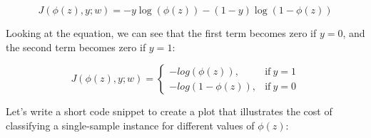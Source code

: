 \documentclass[11pt]{article}
\begin{document}
\[J(\phi(z), y;w) = -y \log(\phi(z)) - (1 - y) \log(1 - \phi(z))\]

Looking at the equation, we can see that the first term becomes zero if
\(y = 0\), and the second term becomes zero if \(y = 1\):

\begin{equation}
J(\phi(z), y;w) = 
\begin{cases}
   -log(\phi(z)), & \text{if}\ y = 1 \\
   -log(1 - \phi(z)), & \text{if}\ y = 0 
\end{cases}
\end{equation}

Let's write a short code snippet to create a plot that illustrates the
cost of classifying a single-sample instance for different values of
\(\phi(z)\):
\end{document}
